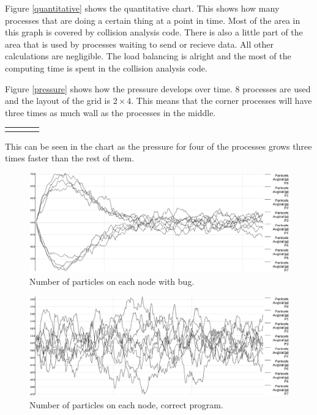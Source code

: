 \documentclass[a4paper,11pt]{article}
\begin{document}
Figure \ref{quantitative} shows the quantitative chart.
This shows how many processes that are doing a certain thing at a point in time.
Most of the area in this graph is covered by collision analysis code.
There is also a little part of the area that is used by processes waiting to send or recieve data.
All other calculations are negligible.
The load balancing is alright and the most of the computing time is spent in the collision analysis code.

Figure \ref{pressure} shows how the pressure develops over time.
8 processes are used and the layout of the grid is $2\times4$.
This means that the corner processes will have three times as much wall as the processes in the middle.
\begin{center}
  \begin{tabular}[h]{|l|l|l|l|}
    \hline
    &   &   &  \\[2ex]
    \hline
    &   &   &  \\[2ex]
    \hline
  \end{tabular}
\end{center}
This can be seen in the chart as the pressure for four of the processes grows three times faster than the rest of them.

\begin{figure}[!h]
  \caption{Number of particles on each node with bug.}
  \label{bug}
  \includegraphics[width=15cm]{chart_no_particles_bug.png}
\end{figure}

\begin{figure}[!h]
  \caption{Number of particles on each node, correct program.}
  \label{correct}
  \includegraphics[width=15cm]{chart_no_particles_correct.png}
\end{figure}
\end{document}
